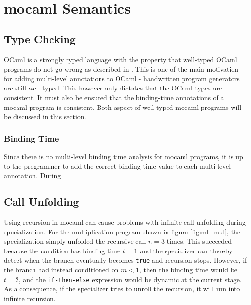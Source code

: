 
\section{mocaml Semantics}

\subsection{Type Chcking}

OCaml is a strongly typed language with the property that well-typed OCaml programs do not go wrong as described in \cite{MilnerRobin1978Atot}. This is one of the main motivation for adding multi-level annotations to OCaml - handwritten program generators are still well-typed. This however only dictates that the OCaml types are consistent. It must also be ensured that the binding-time annotations of a mocaml program is consistent. Both aspect of well-typed mocaml programs will be discussed in this section.

\subsubsection{Binding Time}

Since there is no multi-level binding time analysis for mocaml programs, it is up to the programmer to add the correct binding time value to each multi-level annotation. During

\subsection{Call Unfolding}
Using recursion in mocaml can cause problems with infinite call unfolding during specialization. For the multiplication program shown in figure \ref{fig:ml_mul}, the specialization simply unfolded the recursive call $n=3$ times. This succeeded because the condition has binding time $t=1$ and the specializer can thereby detect when the branch eventually becomes \texttt{true} and recursion stops. However, if the branch had instead conditioned on $m < 1$, then the binding time would be $t = 2$, and the \texttt{if-then-else} expression would be dynamic at the current stage. As a consequence, if the specializer tries to unroll the recursion, it will run into infinite recursion. 


